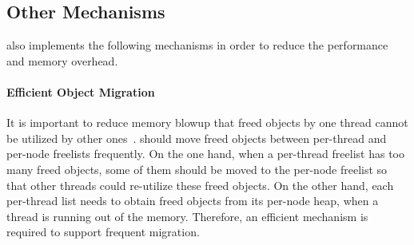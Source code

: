 \subsection{Other Mechanisms}
\label{sec: others}

\NM{} also implements the following mechanisms in order to reduce the performance and memory overhead. 

\paragraph{Efficient Object Migration} It is important to reduce memory blowup that freed objects by one thread cannot be utilized by other ones~\citep{Hoard}.  \NM{} should move freed objects between per-thread and per-node freelists frequently. On the one hand, when a per-thread freelist has too many freed objects, some of them should be moved to the per-node freelist so that other threads could re-utilize these freed objects. On the other hand, each per-thread list needs to obtain freed objects from its per-node heap, when a thread is running out of the memory. 
Therefore, an efficient mechanism is required to support frequent migration. 

